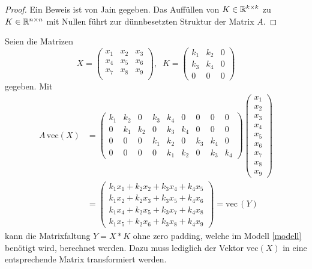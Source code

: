 \begin{proof}
    Ein Beweis ist von Jain \cite{jain1989fundamentals} gegeben. Das Auffüllen von $K \in \mathbb{R}^{k \times k}$ zu $K \in \mathbb{R}^{n \times n}$ mit Nullen führt zur dünnbesetzten Struktur der Matrix $A$. 
\end{proof}
\begin{bsp}
    \label{bsp:Kzeropad}
    Seien die Matrizen
    \begin{equation*}
        X=\begin{pmatrix}
            x_1 & x_2 &x_3 \\
            x_4 & x_5 &x_6 \\
            x_7 & x_8 &x_9 \\
        \end{pmatrix}, \; \;
        K=\begin{pmatrix}
            k_1 & k_2 &0\\
            k_3 &k_4 &0 \\
            0 &0 &0
        \end{pmatrix}
    \end{equation*}
    gegeben. Mit 
    \begin{align*}
    A \, \mathrm{vec}(X) &=    
    \begin{pmatrix}
        k_1 & k_2 & 0 &k_3 &k_4 &0 &0 &0 &0 \\
        0 & k_1 & k_2 &0 &k_3 &k_4 &0 &0 &0 \\
        0 & 0 & 0 &k_1 &k_2 &0 &k_3 &k_4 &0 \\
        0 & 0 & 0 &0 &k_1 &k_2 &0 &k_3 &k_4 
    \end{pmatrix}
    \begin{pmatrix}
        x_1 \\
        x_2 \\
        x_3 \\
        x_4 \\
        x_5 \\
        x_6 \\
        x_7 \\
        x_8 \\
        x_9
    \end{pmatrix} \\
    &=\begin{pmatrix}
        k_1 x_1+ k_2 x_2 +k_3 x_4 +k_4 x_5 \\
        k_1 x_2+ k_2 x_3 +k_3 x_5 +k_4 x_6 \\
        k_1 x_4+ k_2 x_5 +k_3 x_7 +k_4 x_8 \\
        k_1 x_5+ k_2 x_6 +k_3 x_8 +k_4 x_9 
    \end{pmatrix}=\mathrm{vec} \, (Y)
\end{align*}
kann die Matrixfaltung $Y = X \ast K$ ohne zero padding, welche im Modell \ref{modell} benötigt wird, berechnet werden. Dazu muss lediglich der Vektor $\mathrm{vec}(X)$ in eine entsprechende Matrix transformiert werden.
\end{bsp}
